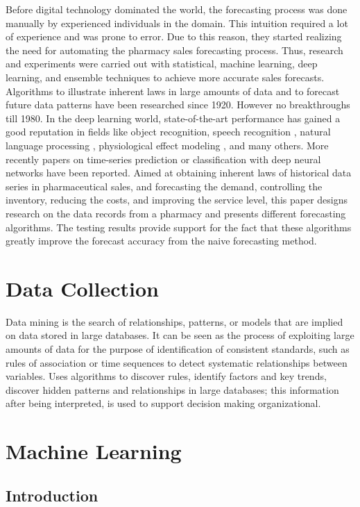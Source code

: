 \documentclass[12pt]{report}
\begin{document}
Before digital technology dominated the world, the forecasting process was done manually by experienced individuals in the domain. This intuition required a lot of experience and was prone to error. Due to this reason, they started realizing the need for automating the pharmacy sales forecasting process. 
Thus, research and experiments were carried out with statistical, machine learning, deep learning, and ensemble techniques to achieve more accurate sales forecasts. \cite{2}
Algorithms to illustrate inherent laws in large amounts of data and to forecast future data patterns have been researched since 1920. However no breakthroughs till 1980. \cite{3}
In the deep learning world, state-of-the-art performance has gained a good reputation in fields like object recognition, \cite{4} speech recognition \cite{5}, natural language processing \cite{6},
physiological effect modeling \cite{7}, and many others. More recently papers on time-series prediction or classification with deep neural networks have been reported. \cite{8,9,10,11}
Aimed at obtaining inherent laws of historical data series in pharmaceutical sales, and forecasting the demand, controlling the inventory, reducing the costs, and improving the service level, this paper designs research on the data records from a pharmacy and presents different forecasting algorithms. The testing results provide support for the fact that these algorithms greatly improve the forecast accuracy from the naive forecasting method.

\section{Data Collection}

Data mining is the search of relationships, patterns, or models that are implied on data stored
in large databases. It can be seen as the process of exploiting large amounts of data for the
purpose of identification of consistent standards, such as rules of association or time sequences
to detect systematic relationships between variables. Uses algorithms to discover rules, identify
factors and key trends, discover hidden patterns and relationships in large databases; this
information after being interpreted, is used to support decision making organizational.

\section{Machine Learning}

\subsection{Introduction}
\end{document}

